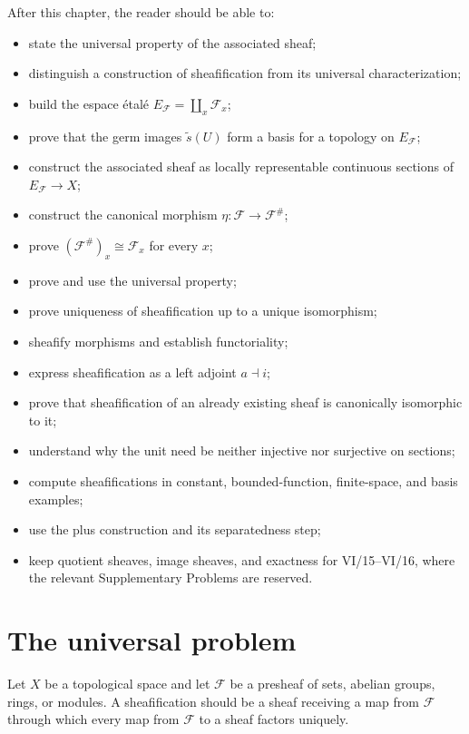 After this chapter, the reader should be able to:
\begin{itemize}
\item state the universal property of the associated sheaf;
\item distinguish a construction of sheafification from its universal characterization;
\item build the espace \'{e}tal\'{e} $E_{\mathcal F}=\coprod_x\mathcal F_x$;
\item prove that the germ images $\widetilde s(U)$ form a basis for a topology on $E_{\mathcal F}$;
\item construct the associated sheaf as locally representable continuous sections of
$E_{\mathcal F}\to X$;
\item construct the canonical morphism $\eta:\mathcal F\to\mathcal F^\#$;
\item prove $(\mathcal F^\#)_x\cong\mathcal F_x$ for every $x$;
\item prove and use the universal property;
\item prove uniqueness of sheafification up to a unique isomorphism;
\item sheafify morphisms and establish functoriality;
\item express sheafification as a left adjoint $a\dashv i$;
\item prove that sheafification of an already existing sheaf is canonically isomorphic to it;
\item understand why the unit need be neither injective nor surjective on sections;
\item compute sheafifications in constant, bounded-function, finite-space, and basis examples;
\item use the plus construction and its separatedness step;
\item keep quotient sheaves, image sheaves, and exactness for VI/15--VI/16, where the relevant
Supplementary Problems are reserved.
\end{itemize}

\section{The universal problem}

Let $X$ be a topological space and let $\mathcal F$ be a presheaf of sets, abelian groups,
rings, or modules.  A sheafification should be a sheaf receiving a map from $\mathcal F$
through which every map from $\mathcal F$ to a sheaf factors uniquely.

